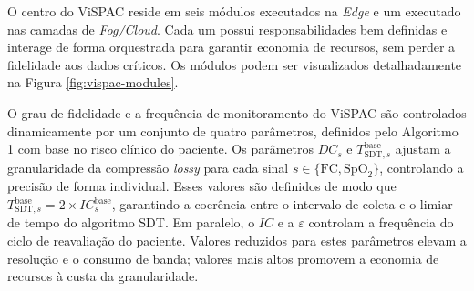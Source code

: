 \documentclass[twoside,english,brazilian]{UNISINOSmonografia}
\begin{document}
O centro do ViSPAC reside em seis módulos executados na \textit{Edge} e um executado nas camadas de \textit{Fog/Cloud}. Cada um possui responsabilidades bem definidas e interage de forma orquestrada para garantir economia de recursos, sem perder a fidelidade aos dados críticos. Os módulos podem ser visualizados detalhadamente na Figura \ref{fig:vispac-modules}.

O grau de fidelidade e a frequência de monitoramento do ViSPAC são controlados dinamicamente por um conjunto de quatro parâmetros, definidos pelo Algoritmo 1 com base no risco clínico do paciente. Os parâmetros $DC_s$ e $T_{\text{SDT},s}^{\text{base}}$ ajustam a granularidade da compressão \textit{lossy} para cada sinal $s \in \{\text{FC}, \text{SpO}_2\}$, controlando a precisão de forma individual. Esses valores são definidos de modo que $T_{\text{SDT},s}^{\text{base}} = 2 \times IC^{\text{base}}_s$, garantindo a coerência entre o intervalo de coleta e o limiar de tempo do algoritmo SDT. Em paralelo, o $IC$ e a $\varepsilon$ controlam a frequência do ciclo de reavaliação do paciente. Valores reduzidos para estes parâmetros elevam a resolução e o consumo de banda; valores mais altos promovem a economia de recursos à custa da granularidade.
\end{document}
